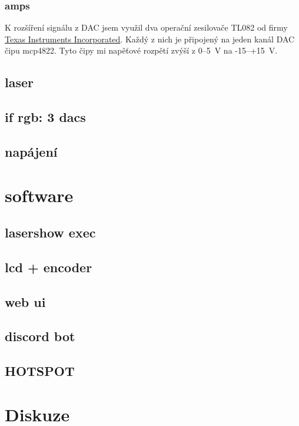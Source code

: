 \documentclass{template/socthesis}
\begin{document}
\subsection{amps}
K rozšíření signálu z DAC jsem využil dva operační zesilovače TL082 od firmy \href{https://www.ti.com/}{Texas Instruments Incorporated}. Každý z nich je připojený na jeden kanál DAC čipu mcp4822.
Tyto čipy mi napěťové rozpětí zvýší z 0--5~V na -15--+15~V.

\section{laser}
\section{if rgb: 3 dacs}



\section{napájení}

\chapter{software}
\section{lasershow exec}
\section{lcd + encoder}
\section{web ui}
\section{discord bot}
\section{HOTSPOT}

\chapter{Diskuze}
\end{document}
